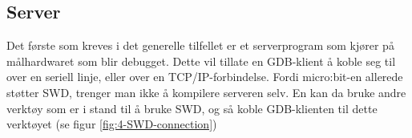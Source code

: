 \subsection{Server}

Det første som kreves i det generelle tilfellet er et serverprogram som kjører på målhardwaret som blir debugget. Dette vil tillate en GDB-klient å koble seg til over en seriell linje, eller over en TCP/IP-forbindelse. Fordi micro:bit-en allerede støtter SWD, trenger man ikke å kompilere serveren selv. En kan da bruke andre verktøy som er i stand til å bruke SWD, og så koble GDB-klienten til dette verktøyet (se figur \ref{fig:4-SWD-connection})

\begin{figure}[ht]
    \centering
    


\begin{tikzpicture}[x=0.75pt,y=0.75pt,yscale=-1.3,xscale=1.3]


\end{tikzpicture}
\end{figure}
